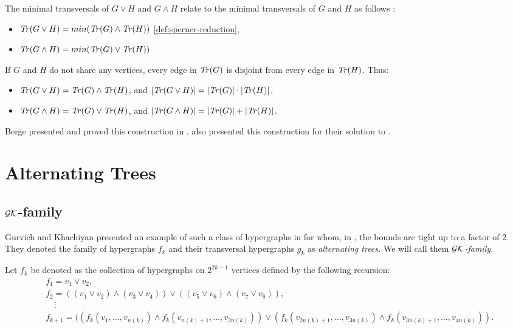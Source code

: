 The minimal transversals of $G\vee H$ and $G\wedge H$ relate to the minimal transversals of $G$ and $H$ as follows \cite{Ber87}:
\begin{itemize}
\item $\mathit{Tr}(G\vee H)=min(\mathit{Tr}(G)\wedge\mathit{Tr}(H))$ \ref{def:sperner-reduction},
\item $\mathit{Tr}(G\wedge H)=min(\mathit{Tr}(G)\vee\mathit{Tr}(H))$
\end{itemize}
If $G$ and $H$ do not share any vertices, every edge in $\mathit{Tr}(G)$ is disjoint from every edge in $\mathit{Tr}(H)$. Thus:
\begin{itemize}
\item $\mathit{Tr}(G\vee H)=\mathit{Tr}(G)\wedge\mathit{Tr}(H)$, and $|\mathit{Tr}(G\vee H)|=|\mathit{Tr}(G)|\cdot|\mathit{Tr}(H)|$,
\item $\mathit{Tr}(G\wedge H)=\mathit{Tr}(G)\vee\mathit{Tr}(H)$, and $|\mathit{Tr}(G\wedge H)|=|\mathit{Tr}(G)|+|\mathit{Tr}(H)|$.
\end{itemize}
\cite{Tak08}

Berge presented and proved this construction in \cite{Ber87}. \cite{KS03} also presented this construction for their solution to \FKA.

\section{Alternating Trees}\label{sec:alternating}

\subsection{$\mathcal{GK}$-family}

Gurvich and Khachiyan presented an example of such a class of hypergraphs in \cite{GK99} for whom, in \FKA, the bounds are tight up to a factor of 2. They denoted the family of hypergraphs $f_k$ and their transversal hypergraphs $g_k$ as \emph{alternating trees.} We will call them \emph{$\mathcal{GK}$-family.}

Let $f_k$ be denoted as the collection of hypergraphs on $2^{2k-1}$ vertices defined by the following recursion:
\begin{align*}
&f_1=v_1\vee v_2,\\
&f_2=((v_1\vee v_2)\wedge(v_3\vee v_4))\vee((v_5\vee v_6)\wedge(v_7\vee v_8)),\\
&\quad\vdots\\
&f_{k+1}=((f_k(v_1,\dots,v_{n(k)})\wedge f_k(v_{n(k)+1},\dots,v_{2n(k)}))\vee(f_k(v_{2n(k)+1},\dots,v_{3n(k)})\wedge f_k(v_{3n(k)+1},\dots,v_{4n(k)})).
\end{align*}

